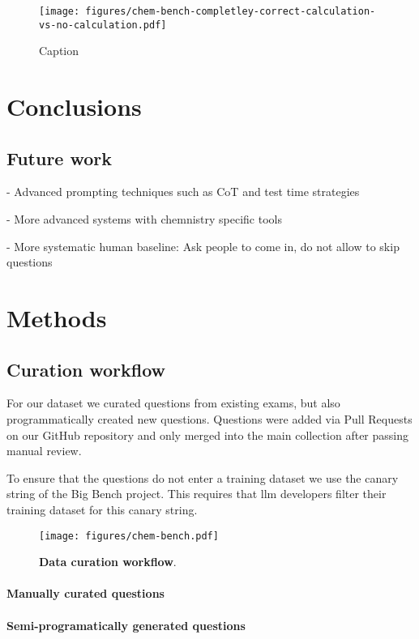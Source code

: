 \documentclass[11pt, oneside]{article}
\begin{document}
\begin{figure}
    \centering
    \texttt{[image: figures/chem-bench-completley-correct-calculation-vs-no-calculation.pdf]}
    \caption{Caption}
    \label{fig:enter-label}
\end{figure}


\section{Conclusions}

\subsection{Future work}
- Advanced prompting techniques such as CoT and test time strategies

- More advanced systems with chemnistry specific tools

- More systematic human baseline: Ask people to come in, do not allow to skip questions

\section{Methods}

\subsection{Curation workflow}\label{sec:curation}
For our dataset we curated questions from existing exams, but also programmatically created new questions.
Questions were added via Pull Requests on our GitHub repository and only merged into the main collection after passing manual review.

To ensure that the questions do not enter a training dataset we use the canary string of the Big Bench project.
This requires that \Gls{llm} developers filter their training dataset for this canary string.

\begin{figure}
    \texttt{[image: figures/chem-bench.pdf]}
        \caption{\textbf{Data curation workflow}.}
\end{figure}

\paragraph{Manually curated questions}

\paragraph{Semi-programatically generated questions}
\end{document}
